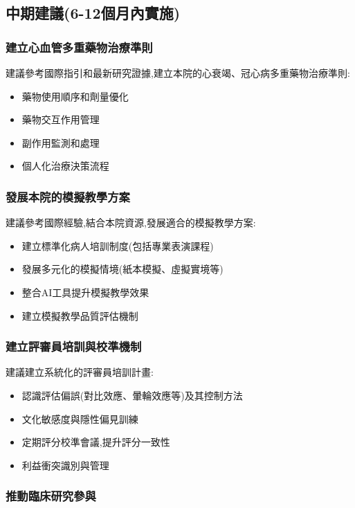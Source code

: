 \documentclass[12pt,a4paper]{article}
\begin{document}
\subsection{中期建議(6-12個月內實施)}

\subsubsection{建立心血管多重藥物治療準則}

建議參考國際指引和最新研究證據,建立本院的心衰竭、冠心病多重藥物治療準則:
\begin{itemize}[nosep]
    \item 藥物使用順序和劑量優化
    \item 藥物交互作用管理
    \item 副作用監測和處理
    \item 個人化治療決策流程
\end{itemize}

\subsubsection{發展本院的模擬教學方案}

建議參考國際經驗,結合本院資源,發展適合的模擬教學方案:
\begin{itemize}[nosep]
    \item 建立標準化病人培訓制度(包括專業表演課程)
    \item 發展多元化的模擬情境(紙本模擬、虛擬實境等)
    \item 整合AI工具提升模擬教學效果
    \item 建立模擬教學品質評估機制
\end{itemize}

\subsubsection{建立評審員培訓與校準機制}

建議建立系統化的評審員培訓計畫:
\begin{itemize}[nosep]
    \item 認識評估偏誤(對比效應、暈輪效應等)及其控制方法
    \item 文化敏感度與隱性偏見訓練
    \item 定期評分校準會議,提升評分一致性
    \item 利益衝突識別與管理
\end{itemize}

\subsubsection{推動臨床研究參與}
\end{document}
